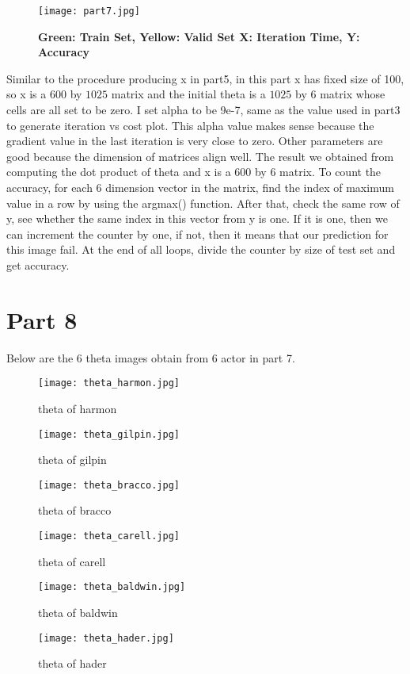 \documentclass{article}
\begin{document}
\begin{figure}[!htb]
  \texttt{[image: part7.jpg]}
  \caption*{\Large \textbf{\hspace*{5cm}Green: Train Set, Yellow: Valid Set \newline \hspace*{5.5cm}X: Iteration Time, Y: Accuracy}}\label{fig:part5}
\end{figure}

Similar to the procedure producing x in part5, in this part x has fixed size of 100, so x is a $600$ by $1025$ matrix and the initial theta is a $1025$ by $6$ matrix whose cells are all set to be zero. I set alpha to be 9e-7, same as the value used in part3 to generate iteration vs cost plot. This alpha value makes sense because the gradient value in the last iteration is very close to zero. Other parameters are good because the dimension of matrices align well. The result we obtained from computing the dot product of theta and x is a $600$ by $6$ matrix. To count the accuracy, for each 6 dimension vector in the matrix, find the index of maximum value in a row by using the argmax() function. After that, check the same row of y, see whether the same index in this vector from y is one. If it is one, then we can increment the counter by one, if not, then it means that our prediction for this image fail. At the end of all loops, divide the counter by size of test set and get accuracy.

\section*{Part 8}
Below are the 6 theta images obtain from 6 actor in part 7.
\begin{figure}[!htb]
  \texttt{[image: theta\_harmon.jpg]}
  \caption*{theta of harmon}\label{fig:baldwin}
\endminipage\hfill
{}
  \texttt{[image: theta\_gilpin.jpg]}
  \caption*{theta of gilpin}\label{fig:hader}
\endminipage\hfill
{}
  \texttt{[image: theta\_bracco.jpg]}
  \caption*{theta of bracco}\label{fig:baldwin}
\endminipage\hfill
\end{figure}

\begin{figure}[!htb]
  \texttt{[image: theta\_carell.jpg]}
  \caption*{theta of carell}\label{fig:baldwin}
\endminipage\hfill
{}
  \texttt{[image: theta\_baldwin.jpg]}
  \caption*{theta of baldwin}\label{fig:baldwin}
\endminipage\hfill
{}
  \texttt{[image: theta\_hader.jpg]}
  \caption*{theta of hader}\label{fig:baldwin}
\endminipage
\end{figure}
\end{document}
